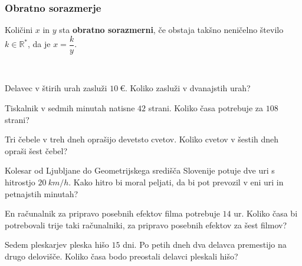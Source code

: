         \subsubsection*{Obratno sorazmerje}
        Količini $x$ in $y$ sta \textbf{obratno sorazmerni}, če obstaja takšno neničelno število $k\in\mathbb{R}^*$, da je $x=\dfrac{k}{y}$.
        

    
~~~~\\


    
        \begin{naloga}
            Delavec v štirih urah zasluži $10~€$. Koliko zasluži v dvanajstih urah?            
        \end{naloga}

        \begin{naloga}
            Tiskalnik v sedmih minutah natisne $42$ strani. Koliko časa potrebuje za $108$ strani?            
        \end{naloga}

        \begin{naloga}
            Tri čebele v treh dneh oprašijo devetsto cvetov. Koliko cvetov v šestih dneh opraši šest čebel?            
        \end{naloga}
 
        \begin{naloga}
            Kolesar od Ljubljane do Geometrijskega središča Slovenije potuje dve uri s hitrostjo $20~km/h$. 
            Kako hitro bi moral peljati, da bi pot prevozil v eni uri in petnajstih minutah?            
        \end{naloga}
        
        \begin{naloga}
            En računalnik za pripravo posebnih efektov filma potrebuje $14$ ur.
            Koliko časa bi potrebovali trije taki računalniki, za pripravo posebnih efektov za šest filmov?            
        \end{naloga}

        \begin{naloga}
            Sedem pleskarjev pleska hišo $15$ dni. Po petih dneh dva delavca premestijo na drugo delovišče.
            Koliko časa bodo preostali delavci pleskali hišo?            
        \end{naloga}

    

        \newpage


